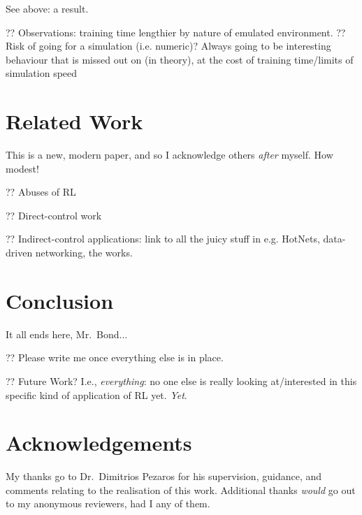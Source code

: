 \documentclass[conference, letterpaper, 10pt, times]{IEEEtran}
\begin{document}
See above: a result.

?? Observations: training time lengthier by nature of emulated environment.
?? Risk of going for a simulation (i.e. numeric)? Always going to be interesting behaviour that is missed out on (in theory), at the cost of training time/limits of simulation speed

\section{Related Work}

This is a new, modern paper, and so I acknowledge others \emph{after} myself.
How modest!

?? Abuses of RL

?? Direct-control work

?? Indirect-control applications: link to all the juicy stuff in e.g. HotNets, data-driven networking, the works. 

\section{Conclusion}

It all ends here, Mr.\ Bond...

?? Please write me once everything else is in place.

?? Future Work? I.e., \emph{everything}: no one else is really looking at/interested in this specific kind of application of RL yet. \emph{Yet}.

\section*{Acknowledgements}
My thanks go to Dr.\ Dimitrios Pezaros for his supervision, guidance, and comments relating to the realisation of this work.
Additional thanks \emph{would} go out to my anonymous reviewers, had I any of them.

\printbibliography
\end{document}
